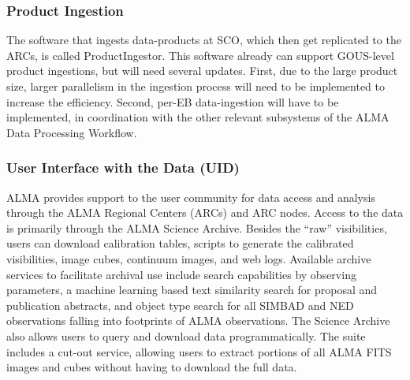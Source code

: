 \subsubsection{Product Ingestion}
\label{sec:ASA}
The software that ingests data-products at SCO, which then get replicated to the ARCs, is called ProductIngestor. This software already can support GOUS-level product ingestions, but will need several updates. First, due to the large product size, larger parallelism in the ingestion process will need to be implemented to increase the efficiency. Second, per-EB data-ingestion will have to be implemented, in coordination with the other relevant subsystems of the ALMA Data Processing Workflow.



\subsubsection{User Interface with the Data (UID)}


ALMA provides support to the user community for data access and analysis through the ALMA Regional Centers (ARCs) and ARC nodes. Access to the data is primarily through the ALMA Science Archive. Besides the ``raw'' visibilities, users can download calibration tables, scripts to generate the calibrated visibilities, image cubes, continuum images, and web logs. Available archive services to facilitate archival use include search capabilities by observing parameters, a machine learning based text similarity search for proposal and publication abstracts, and object type search for all SIMBAD and NED observations falling into footprints of ALMA observations. The Science Archive also allows users to query and download data programmatically. The suite includes a cut-out service, allowing users to extract portions of all ALMA FITS images and cubes without having to download the full data.

